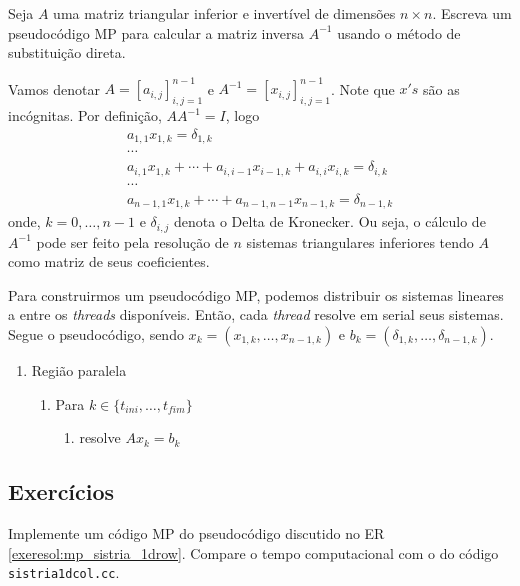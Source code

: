 \begin{exeresol}
  Seja $A$ uma matriz triangular inferior e invertível de dimensões $n\times n$. Escreva um pseudocódigo MP para calcular a matriz inversa $A^{-1}$ usando o método de substituição direta.
\end{exeresol}
\begin{resol}
  Vamos denotar $A=[a_{i,j}]_{i,j=1}^{n-1}$ e $A^{-1} = [x_{i,j}]_{i,j=1}^{n-1}$. Note que $x's$ são as incógnitas. Por definição, $AA^{-1}=I$, logo
  \begin{gather}
    a_{1,1}x_{1,k} = \delta_{1,k}\\
    \cdots\\
    a_{i,1}x_{1,k}+\cdots+a_{i,i-1}x_{i-1,k}+a_{i,i}x_{i,k}=\delta_{i,k}\\
    \cdots\\
    a_{n-1,1}x_{1,k}+\cdots+a_{n-1,n-1}x_{n-1,k}=\delta_{n-1,k}
  \end{gather}
  onde, $k=0,\dotsc,n-1$ e $\delta_{i,j}$ denota o Delta de Kronecker. Ou seja, o cálculo de $A^{-1}$ pode ser feito pela resolução de $n$ sistemas triangulares inferiores tendo $A$ como matriz de seus coeficientes.

  Para construirmos um pseudocódigo MP, podemos distribuir os sistemas lineares a entre os {\it threads} disponíveis. Então, cada {\it thread} resolve em serial seus sistemas. Segue o pseudocódigo, sendo $x_k=(x_{1,k},\dotsc,x_{n-1,k})$ e $b_k = (\delta_{1,k},\dotsc,\delta_{n-1,k})$.
  \begin{enumerate}
  \item Região paralela
    \begin{enumerate}
    \item Para $k\in\{t_{ini},\dotsc,t_{fim}\}$
      \begin{enumerate}
      \item resolve $Ax_k=b_k$
      \end{enumerate}
    \end{enumerate}
  \end{enumerate}
\end{resol}

\subsection*{Exercícios}

\begin{exer}
  Implemente um código MP do pseudocódigo discutido no ER \ref{exeresol:mp_sistria_1drow}. Compare o tempo computacional com o do código \verb+sistria1dcol.cc+.
\end{exer}

